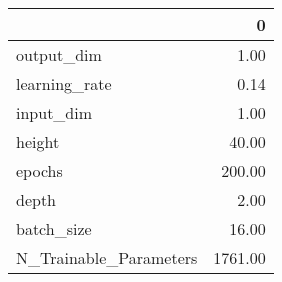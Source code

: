 \begin{tabular}{lr}
\toprule
{} &        0 \\
\midrule
output\_dim             &     1.00 \\
learning\_rate          &     0.14 \\
input\_dim              &     1.00 \\
height                 &    40.00 \\
epochs                 &   200.00 \\
depth                  &     2.00 \\
batch\_size             &    16.00 \\
N\_Trainable\_Parameters &  1761.00 \\
\bottomrule
\end{tabular}
